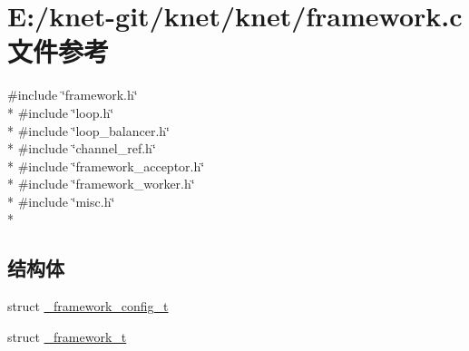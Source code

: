 \hypertarget{a00048}{}\section{E\+:/knet-\/git/knet/knet/framework.c 文件参考}
\label{a00048}
{\ttfamily \#include \char`\"{}framework.\+h\char`\"{}}\\*
{\ttfamily \#include \char`\"{}loop.\+h\char`\"{}}\\*
{\ttfamily \#include \char`\"{}loop\+\_\+balancer.\+h\char`\"{}}\\*
{\ttfamily \#include \char`\"{}channel\+\_\+ref.\+h\char`\"{}}\\*
{\ttfamily \#include \char`\"{}framework\+\_\+acceptor.\+h\char`\"{}}\\*
{\ttfamily \#include \char`\"{}framework\+\_\+worker.\+h\char`\"{}}\\*
{\ttfamily \#include \char`\"{}misc.\+h\char`\"{}}\\*
\subsection*{结构体}
\begin{DoxyCompactItemize}
\item 
struct \hyperlink{a00010}{\+\_\+framework\+\_\+config\+\_\+t}
\item 
struct \hyperlink{a00011}{\+\_\+framework\+\_\+t}
\end{DoxyCompactItemize}
